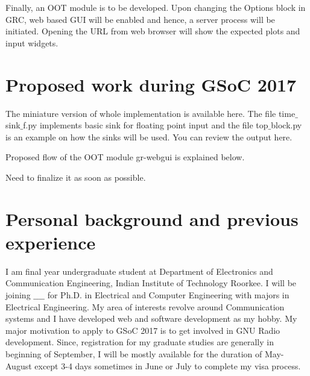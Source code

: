 \documentclass[a4paper, 11pt]{article}
\begin{document}
Finally, an OOT module is to be developed. Upon changing the Options block in GRC, web based GUI will be enabled and hence, a server process will be initiated. Opening the URL from web browser will show the expected plots and input widgets.

\section{Proposed work during GSoC 2017}
The miniature version of whole implementation is available here. The file time$\_$sink$\_$f.py implements basic sink for floating point input and the file top$\_$block.py is an example on how the sinks will be used. You can review the output here.

Proposed flow of the OOT module gr-webgui is explained below.

Need to finalize it as soon as possible.

\section{Personal background and previous experience}
I am final year undergraduate student at Department of Electronics and Communication Engineering, Indian Institute of Technology Roorkee. I will be joining $\_\_\_\_$ for Ph.D. in Electrical and Computer Engineering with majors in Electrical Engineering. My area of interests revolve around Communication systems and I have developed web and software development as my hobby. My major motivation to apply to GSoC 2017 is to get involved in GNU Radio development. Since, registration for my graduate studies are generally in beginning of September, I will be mostly available for the duration of May-August except 3-4 days sometimes in June or July to complete my visa process.
\end{document}
